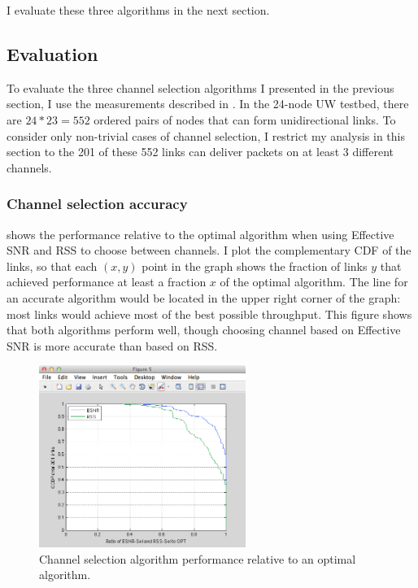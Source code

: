 I evaluate these three algorithms in the next section.

\subsection{Evaluation}
To evaluate the three channel selection algorithms I presented in the previous section, I use the measurements described in . In the 24-node UW testbed, there are $24*23=552$ ordered pairs of nodes that can form unidirectional links. To consider only non-trivial cases of channel selection, I restrict my analysis in this section to the 201 of these 552 links can deliver packets on at least 3 different channels.

\subsubsection{Channel selection accuracy}
 shows the performance relative to the optimal algorithm when using Effective SNR and RSS to choose between channels. I plot the complementary CDF of the links, so that each $(x,y)$ point in the graph shows the fraction of links $y$ that achieved performance at least a fraction $x$ of the optimal algorithm. The line for an accurate algorithm would be located in the upper right corner of the graph: most links would achieve most of the best possible throughput. This figure shows that both algorithms perform well, though choosing channel based on Effective SNR is more accurate than based on RSS\@.

\begin{figure}[htp]
	\centering
	\includegraphics[width=0.6\textwidth]{figures/esnr/chan_sel_ratio_opt.png}
	\caption{\label{fig:chan_sel_ratio_opt}Channel selection algorithm performance relative to an optimal algorithm.}
\end{figure}

